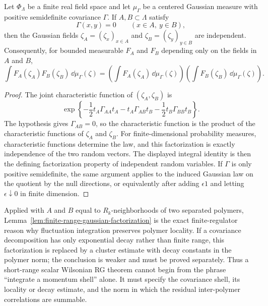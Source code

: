 \begin{lemma}
\label{lem:finite-range-gaussian-factorization}
Let \(\Phi_\Lambda\) be a finite real field space and let
\(\mu_{\Gamma}\) be a centered Gaussian measure with positive semidefinite
covariance \(\Gamma\).  If \(A,B\subset\Lambda\) satisfy
\[
  \Gamma(x,y)=0\qquad (x\in A,\ y\in B),
\]
then the Gaussian fields \(\zeta_A=(\zeta_x)_{x\in A}\) and
\(\zeta_B=(\zeta_y)_{y\in B}\) are independent.  Consequently, for bounded
measurable \(F_A\) and \(F_B\) depending only on the fields in \(A\) and
\(B\),
\begin{equation}
  \int F_A(\zeta_A)F_B(\zeta_B)\,\dd\mu_\Gamma(\zeta)
  =
  \left(\int F_A(\zeta_A)\,\dd\mu_\Gamma(\zeta)\right)
  \left(\int F_B(\zeta_B)\,\dd\mu_\Gamma(\zeta)\right).
  \label{eq:finite-range-gaussian-factorization}
\end{equation}
\end{lemma}

\begin{proof}
The joint characteristic function of \((\zeta_A,\zeta_B)\) is
\[
  \exp\!\left\{
  -\frac12 t_A\Gamma_{AA}t_A
  -t_A\Gamma_{AB}t_B
  -\frac12 t_B\Gamma_{BB}t_B
  \right\}.
\]
The hypothesis gives \(\Gamma_{AB}=0\), so the characteristic function is the
product of the characteristic functions of \(\zeta_A\) and \(\zeta_B\).  For
finite-dimensional probability measures, characteristic functions determine
the law, and this factorization is exactly independence of the two random
vectors.  The displayed integral identity is then the defining factorization
property of independent random variables.  If \(\Gamma\) is only positive
semidefinite, the same argument applies to the induced Gaussian law on the
quotient by the null directions, or equivalently after adding
\(\epsilon 1\) and letting \(\epsilon\downarrow0\) in finite dimension.
\end{proof}

Applied with \(A\) and \(B\) equal to \(R_k\)-neighborhoods of two separated
polymers, Lemma~\ref{lem:finite-range-gaussian-factorization} is the exact
finite-regulator reason why fluctuation integration preserves polymer
locality.  If a covariance decomposition has only exponential decay rather
than finite range, this factorization is replaced by a cluster estimate with
decay constants in the polymer norm; the conclusion is weaker and must be
proved separately.  Thus a short-range scalar Wilsonian RG theorem cannot
begin from the phrase ``integrate a momentum shell'' alone.  It must specify
the covariance shell, its locality or decay estimate, and the norm in which
the residual inter-polymer correlations are summable.

